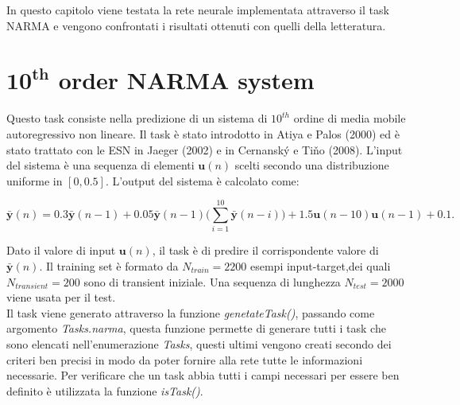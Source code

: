 In questo capitolo viene testata la rete neurale implementata attraverso il task NARMA e vengono confrontati i risultati ottenuti con quelli della letteratura.

\section{$\mathbf{10^{th}}$ order NARMA system}
Questo task consiste nella predizione di un sistema di $10^{th}$ ordine di media mobile autoregressivo non lineare. Il task è stato introdotto in Atiya e Palos (2000) ed è stato trattato con le ESN in Jaeger (2002) e in Cernansk\'y e Ti\v{n}o (2008). L'input del sistema è una sequenza di elementi $\mathbf{u}(n)$ scelti secondo una distribuzione uniforme in $[0,0.5]$. L'output del sistema è calcolato come:

\begin{equation}\label{narma}
	\bar{\mathbf{y}}(n) = 0.3\bar{\mathbf{y}}(n-1) + 0.05\bar{\mathbf{y}}(n-1)\biggl( \sum_{i=1}^{10}\bar{\mathbf{y}}(n - i)\biggr) + 1.5 \mathbf{u}(n-10)\mathbf{u}(n-1) +0.1 .
\end{equation}

Dato il valore di input $\mathbf{u}(n)$, il task è di predire il corrispondente valore di $\bar{\mathbf{y}}(n)$. Il training set è formato da $N_{train}=2200$ esempi input-target,dei quali $N_{transient}=200$ sono di transient iniziale. Una sequenza di lunghezza $N_{test}=2000$ viene usata per il test.\\
Il task viene generato attraverso la funzione \textit{genetateTask()}, passando come argomento \textit{Tasks.narma}, questa funzione permette di generare tutti i task che sono elencati nell'enumerazione \textit{Tasks}, questi ultimi vengono creati secondo dei criteri ben precisi in modo da poter fornire alla rete tutte le informazioni necessarie. Per verificare che un task abbia tutti i campi necessari per essere ben definito è utilizzata la funzione \textit{isTask()}.

